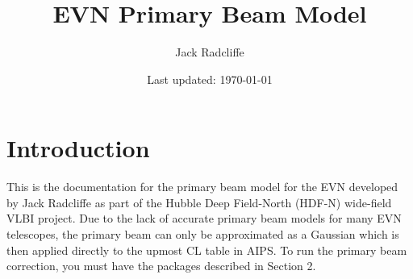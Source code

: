 \documentclass[idxtotoc,hyperref,openany]{article} %
\newcommand{\HRule}{\rule{\linewidth}{0.5mm}} %
\begin{document}

%
%
%
%








\title{EVN Primary Beam Model}
\date{Last updated: \today}
\author{Jack Radcliffe}
\maketitle




\section{Introduction}

This is the documentation for the primary beam model for the EVN developed by Jack Radcliffe as part of the Hubble Deep Field-North (HDF-N) wide-field VLBI project. Due to the lack of accurate primary beam models for many EVN telescopes, the primary beam can only be approximated as a Gaussian which is then applied directly to the upmost CL table in AIPS. To run the primary beam correction, you must have the packages described in Section 2.
\end{document}

